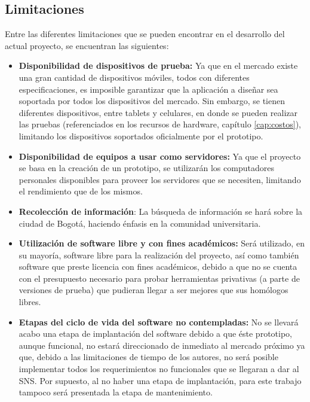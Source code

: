 \subsection{Limitaciones}

Entre las diferentes limitaciones que se pueden encontrar en el desarrollo del actual proyecto, se encuentran las siguientes:

\begin{itemize}
  \item \textbf{Disponibilidad de dispositivos de prueba:} Ya que en el mercado existe una gran cantidad de dispositivos móviles, todos con diferentes especificaciones, es imposible garantizar que la aplicación a diseñar sea soportada por todos los dispositivos del mercado. Sin embargo, se tienen diferentes dispositivos, entre tablets y celulares, en donde se pueden realizar las pruebas (referenciados en los recursos de hardware, capítulo \ref{cap:costos}), limitando los dispositivos soportados oficialmente por el prototipo.

  \item \textbf{Disponibilidad de equipos a usar como servidores:} Ya que el proyecto se basa en la creación de un prototipo, se utilizarán los computadores personales disponibles para proveer los servidores que se necesiten, limitando el rendimiento que de los mismos.
  
  \item \textbf{Recolección de información}: La búsqueda de información se hará sobre la ciudad de Bogotá, haciendo énfasis en la comunidad universitaria.
  
  \item \textbf{Utilización de software libre y con fines académicos:} Será utilizado, en su mayoría, software libre para la realización del proyecto, así como también software que preste licencia con fines académicos, debido a que no se cuenta con el presupuesto necesario para probar herramientas privativas (a parte de versiones de prueba) que pudieran llegar a ser mejores que sus homólogos libres.
  
  \item \textbf{Etapas del ciclo de vida del software no contempladas:} No se llevará acabo una etapa de implantación del software debido a que éste prototipo, aunque funcional, no estará direccionado de inmediato al mercado próximo ya que, debido a las limitaciones de tiempo de los autores, no será posible implementar todos los requerimientos no funcionales que se llegaran a dar al SNS. Por supuesto, al no haber una etapa de implantación, para este trabajo tampoco será presentada la etapa de mantenimiento.
\end{itemize}
